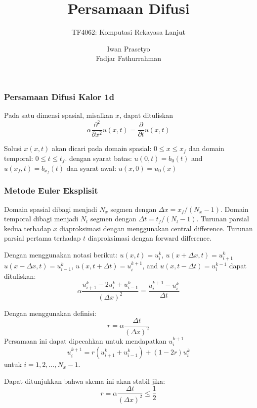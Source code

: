 \documentclass[9pt]{beamer}
\begin{document}
\title{Persamaan Difusi}
\subtitle{TF4062: Komputasi Rekayasa Lanjut}
\author{Iwan Prasetyo\\
Fadjar Fathurrahman}
\date{}


\frame{\titlepage}


\begin{frame}
\frametitle{Persamaan Difusi Kalor 1d}

Pada satu dimensi spasial, misalkan $x$, dapat dituliskan
%
\begin{equation}
\alpha \frac{\partial^{2}}{\partial x^2} u(x,t) = \frac{\partial}{\partial t} u(x,t)
\end{equation}

Solusi $x(x,t)$ akan dicari pada domain spasial: $0 \leq x \leq x_{f}$
dan domain temporal: $0 \leq t \leq t_{f}$.
dengan syarat batas: $u(0,t) = b_{0}(t)$ and $u(x_{f},t) = b_{x_f}(t)$
dan syarat awal: $u(x,0) = u_{0}(x)$

\end{frame}



\begin{frame}
\frametitle{Metode Euler Eksplisit}

Domain spasial dibagi menjadi $N_{x}$ segmen dengan $\Delta x = x_{f}/(N_{x}-1)$.
Domain temporal dibagi menjadi $N_{t}$ segmen dengan $\Delta t = t_{f}/(N_{t}-1)$.
Turunan parsial kedua terhadap $x$ diaproksimasi dengan menggunakan central difference.
Turunan parsial pertama terhadap $t$ diaproksimasi dengan forward difference.

Dengan menggunakan notasi berikut: $u(x,t) = u^{k}_{i}$, $u(x+\Delta x,t) = u^{k}_{i+1}$
$u(x-\Delta x,t) = u^{k}_{i-1}$, $u(x,t+\Delta t) = u^{k+1}_{i}$,
and $u(x,t-\Delta t) = u^{k-1}_{i}$
%
dapat dituliskan:
\begin{equation}
\alpha \frac{u^{k}_{i+1} - 2u^{k}_{i} + u^{k}_{i-1}}{(\Delta x)^2} =
\frac{u^{k+1}_{i} - u^{k}_{i}}{\Delta t}
\end{equation}

Dengan menggunakan definisi:
\begin{equation}
r = \alpha \frac{\Delta t}{(\Delta x)^2}
\end{equation}
Persamaan ini dapat dipecahkan untuk mendapatkan $u^{k+1}_{i}$
\begin{equation}
u^{k+1}_{i} = r \left( u^{k}_{i+1} + u^{k}_{i-1} \right) + (1 - 2r) u^{k}_{i}
\end{equation}
untuk $i = 1, 2, \ldots, N_{x}-1$.

Dapat ditunjukkan bahwa skema ini akan stabil jika:
\begin{equation}
r = \alpha \frac{\Delta t}{(\Delta x)^2} \leq \frac{1}{2}
\end{equation}

\end{frame}
\end{document}
